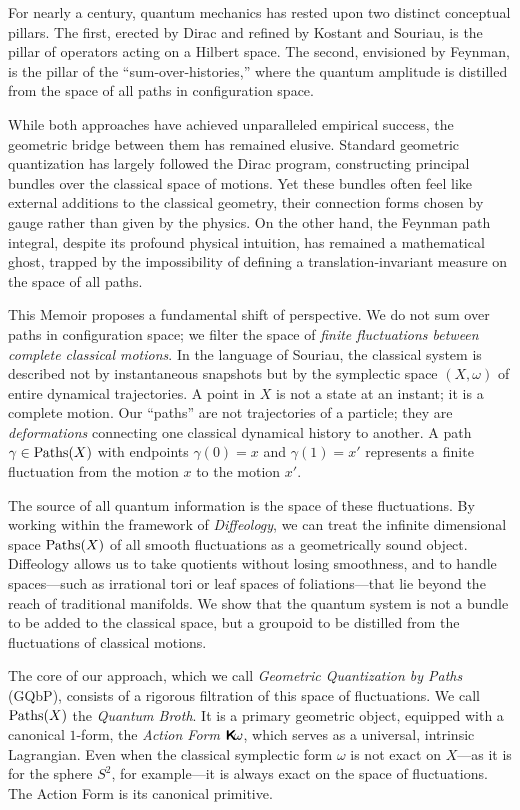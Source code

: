 \documentclass[10pt,reqno,letterpaper,twoside]{amsbook}
\begin{document}
  For nearly a century,
  quantum mechanics has rested upon two distinct conceptual pillars.
  The first,
  erected by Dirac and refined by Kostant and Souriau,
  is the pillar of operators acting on a Hilbert space.
  The second,
  envisioned by Feynman,
  is the pillar of the ``sum-over-histories,''
  where the quantum amplitude is distilled from the space of all paths in configuration space.
  
  While both approaches have achieved unparalleled empirical success,
  the geometric bridge between them has remained elusive.
  Standard geometric quantization has largely followed the Dirac program,
  constructing principal bundles over the classical space of motions.
  Yet these bundles often feel like external additions to the classical geometry,
  their connection forms chosen by gauge rather than given by the physics.
  On the other hand,
  the Feynman path integral,
  despite its profound physical intuition,
  has remained a mathematical ghost,
  trapped by the impossibility of defining a translation-invariant measure on the space of all paths.
  
  This Memoir proposes a fundamental shift of perspective.
  We do not sum over paths in configuration space;
  we filter the space of \emph{finite fluctuations between complete classical motions}.
  In the language of Souriau,
  the classical system is described not by instantaneous snapshots
  but by the symplectic space $(X,\omega)$ of entire dynamical trajectories.
  A point in $X$ is not a state at an instant;
  it is a complete motion.
  Our ``paths'' are not trajectories of a particle;
  they are \emph{deformations} connecting one classical dynamical history to another.
  A path $\gamma \in \operatorname{Paths}(X)$ with endpoints $\gamma(0) = x$ and $\gamma(1) = x'$
  represents a finite fluctuation from the motion $x$ to the motion $x'$.
  
  The source of all quantum information is the space of these fluctuations.
  By working within the framework of \emph{Diffeology},
  we can treat the infinite dimensional space $\operatorname{Paths}(X)$ of all smooth fluctuations as a geometrically sound object.
  Diffeology allows us to take quotients without losing smoothness,
  and to handle spaces---such as irrational tori or leaf spaces of foliations---that lie beyond the reach of traditional manifolds.
  We show that the quantum system is not a bundle to be added to the classical space,
  but a groupoid to be distilled from the fluctuations of classical motions.
  
  The core of our approach,
  which we call \emph{Geometric Quantization by Paths} (GQbP),
  consists of a rigorous filtration of this space of fluctuations.
  We call $\operatorname{Paths}(X)$ the \emph{Quantum Broth}.
  It is a primary geometric object,
  equipped with a canonical $1$-form,
  the \emph{Action Form} $\boldsymbol{\mathsf{K}}\!\omega$,
  which serves as a universal,
  intrinsic Lagrangian.
  Even when the classical symplectic form $\omega$ is not exact on $X$---as it is for the sphere $S^2$, for example---it is always exact on the space of fluctuations.
  The Action Form is its canonical primitive.
  
\end{document}
